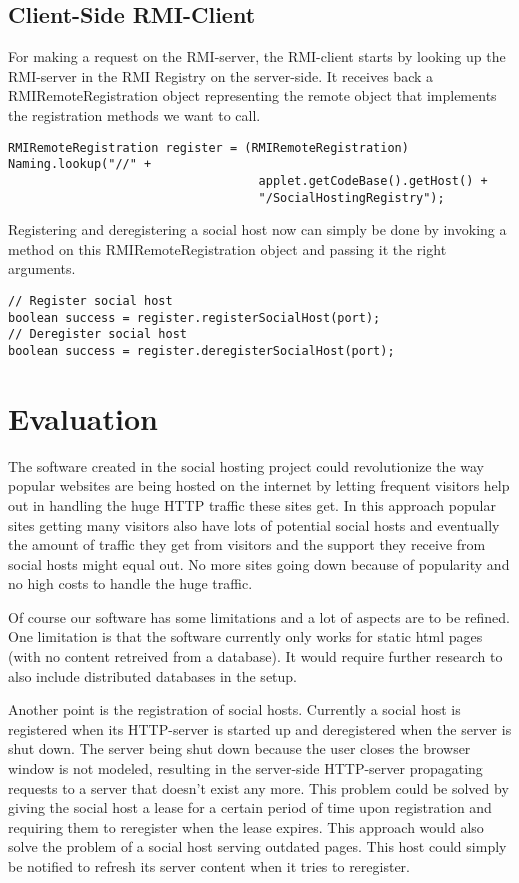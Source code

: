 \documentclass[a4paper, 10pt]{article}
\begin{document}
\subsection{Client-Side RMI-Client}
For making a request on the RMI-server, the RMI-client starts by looking up the RMI-server in the RMI Registry on the server-side. It receives back a RMIRemoteRegistration object representing the remote object that implements the registration methods we want to call.
\begin{lstlisting}
RMIRemoteRegistration register = (RMIRemoteRegistration) Naming.lookup("//" + 
                                   applet.getCodeBase().getHost() +
                                   "/SocialHostingRegistry");
\end{lstlisting}
Registering and deregistering a social host now can simply be done by invoking a method on this RMIRemoteRegistration object and passing it the right arguments.
\begin{lstlisting}
// Register social host
boolean success = register.registerSocialHost(port);
// Deregister social host
boolean success = register.deregisterSocialHost(port);
\end{lstlisting}

\section{Evaluation}
The software created in the social hosting project could revolutionize the way popular websites are being hosted on the internet by letting frequent visitors help out in handling the huge HTTP traffic these sites get. In this approach popular sites getting many visitors also have lots of potential social hosts and eventually the amount of traffic they get from visitors and the support they receive from social hosts might equal out. No more sites going down because of popularity and no high costs to handle the huge traffic.

Of course our software has some limitations and a lot of aspects are to be refined. One limitation is that the software currently only works for static html pages (with no content retreived from a database). It would require further research to also include distributed databases in the setup. 

Another point is the registration of social hosts. Currently a social host is registered when its HTTP-server is started up and deregistered when the server is shut down. The server being shut down because the user closes the browser window is not modeled, resulting in the server-side HTTP-server propagating requests to a server that doesn't exist any more. This problem could be solved by giving the social host a lease for a certain period of time upon registration and requiring them to reregister when the lease expires. This approach would also solve the problem of a social host serving outdated pages. This host could simply be notified to refresh its server content when it tries to reregister.
\end{document}
